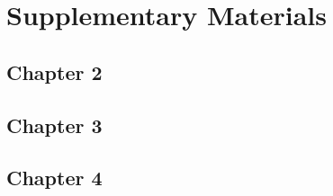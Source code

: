 %
%

\chapter{Supplementary Materials}

\section{Chapter 2}

%
\lipsum[1-1]

\section{Chapter 3}

\lipsum[2-2]

\section{Chapter 4}

\lipsum[3-3]

